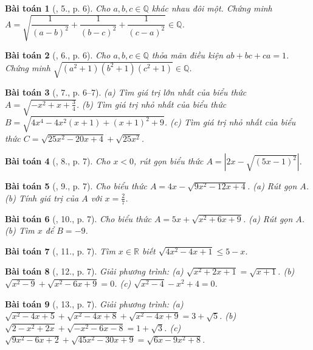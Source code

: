 \documentclass{article}
\newtheorem{baitoan}{Bài toán}
\begin{document}
\begin{baitoan}[\cite{Tuyen_Toan_9}, 5., p. 6]
	Cho $a,b,c\in\mathbb{Q}$ khác nhau đôi một. Chứng minh $A = \sqrt{\dfrac{1}{(a - b)^2} + \dfrac{1}{(b - c)^2} + \dfrac{1}{(c - a)^2}}\in\mathbb{Q}$.
\end{baitoan}

\begin{baitoan}[\cite{Tuyen_Toan_9}, 6., p. 6]
	Cho $a,b,c\in\mathbb{Q}$ thỏa mãn điều kiện $ab + bc + ca = 1$. Chứng minh $\sqrt{(a^2 + 1)(b^2 + 1)(c^2 + 1)}\in\mathbb{Q}$.
\end{baitoan}

\begin{baitoan}[\cite{Tuyen_Toan_9}, 7., p. 6--7]
	(a) Tìm giá trị lớn nhất của biểu thức $A = \sqrt{-x^2 + x + \frac{3}{4}}$. (b) Tìm giá trị nhỏ nhất của biểu thức $B = \sqrt{4x^4 - 4x^2(x + 1) + (x + 1)^2 + 9}$. (c) Tìm giá trị nhỏ nhất của biểu thức $C = \sqrt{25x^2 - 20x + 4} + \sqrt{25x^2}$.
\end{baitoan}

\begin{baitoan}[\cite{Tuyen_Toan_9}, 8., p. 7]
	Cho $x < 0$, rút gọn biểu thức $A = |2x - \sqrt{(5x - 1)^2}|$.
\end{baitoan}

\begin{baitoan}[\cite{Tuyen_Toan_9}, 9., p. 7]
	Cho biểu thức $A = 4x - \sqrt{9x^2 - 12x + 4}$. (a) Rút gọn $A$. (b) Tính giá trị của $A$ với $x = \frac{2}{7}$.
\end{baitoan}

\begin{baitoan}[\cite{Tuyen_Toan_9}, 10., p. 7]
	Cho biểu thức $A = 5x + \sqrt{x^2 + 6x + 9}$. (a) Rút gọn $A$. (b) Tìm $x$ để $B = -9$.
\end{baitoan}

\begin{baitoan}[\cite{Tuyen_Toan_9}, 11., p. 7]
	Tìm $x\in\mathbb{R}$ biết $\sqrt{4x^2 - 4x + 1}\le5 - x$.
\end{baitoan}

\begin{baitoan}[\cite{Tuyen_Toan_9}, 12., p. 7]
	Giải phương trình: (a) $\sqrt{x^2 + 2x + 1} = \sqrt{x + 1}$. (b) $\sqrt{x^2 - 9} + \sqrt{x^2 - 6x + 9} = 0$. (c) $\sqrt{x^2 - 4} - x^2 + 4 = 0$.
\end{baitoan}

\begin{baitoan}[\cite{Tuyen_Toan_9}, 13., p. 7]
	Giải phương trình: (a) $\sqrt{x^2 - 4x + 5} + \sqrt{x^2 - 4x + 8} + \sqrt{x^2 - 4x + 9} = 3 + \sqrt{5}$. (b) $\sqrt{2 - x^2 + 2x} + \sqrt{-x^2 - 6x - 8} = 1 + \sqrt{3}$. (c) $\sqrt{9x^2 - 6x + 2} + \sqrt{45x^2 - 30x + 9} = \sqrt{6x - 9x^2 + 8}$. 
\end{baitoan}
\end{document}
